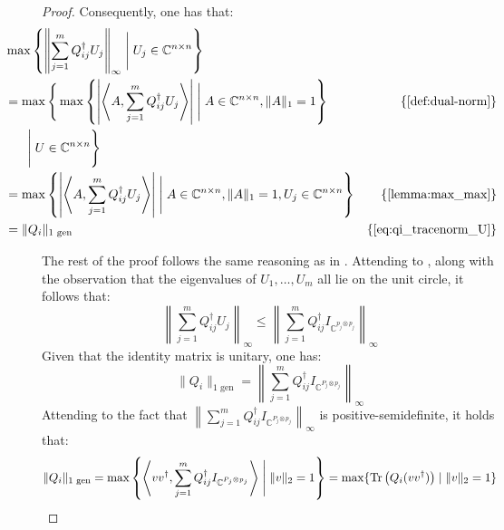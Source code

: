\begin{proof}
Consequently, one has that:
\begin{align}
&\hspace{-30pt} \max \left\{ \left\lVert \sum_{j=1}^{m} Q_{ij}^{\dag} U_j  \right\rVert_{\infty} \Biggm| U_j \in \mathbb{C}^{n \times n} \right\} \notag \\
& \hspace{-30pt} = \max \Bigg\{ \max \left\{ \left| \left\langle A, \sum_{j=1}^{m} Q_{ij}^{\dag}U_j \right\rangle \right| \Biggm| A  \in \mathbb{C}^{n \times n},  \lVert A \rVert_{1} =1  \right\}  & \{\text{\autoref{def:dual-norm}} \}  \notag\\
& \hspace{-15pt}\Biggm|  U \in \mathbb{C}^{n \times n}\Bigg\} \notag\\
&  \hspace{-30pt} =  \max \left\{  \left| \left\langle A, \sum_{j=1}^{m} Q_{ij}^{\dag}U_j \right\rangle \right|  \Biggm|A  \in \mathbb{C}^{n \times n}, \lVert A \rVert_{1} =1,  U_j \in \mathbb{C}^{n \times n} \right\} & \{\text{\autoref{lemma:max_max}}\} \notag \\
& \hspace{-30pt} = \lVert Q_i \rVert_{1 \text{ gen}} & \{\text{\autoref{eq:qi_tracenorm_U}} \} 
\end{align}


The rest of the proof follows the same reasoning as in \cite[Proof of Theorem 3.39 ]{watrous2018theory}. Attending to \cite[ Equation 3.236, Equation 3.237 and Lemma 3.3]{watrous2018theory}, along with the observation
that the eigenvalues of $U_1, \ldots, U_m$ all lie on the unit circle, it follows that:
\begin{equation}
  \left\lVert \sum_{j=1}^{m} Q_{ij}^{\dag} U_j  \right\rVert_{\infty} \leq \left\lVert \sum_{j=1}^{m} Q_{ij}^{\dag} I_{\mathbb{C}^{p_j \otimes p_j}}  \right\rVert_{\infty} 
\end{equation}
Given that the identity matrix is unitary, one has:
\begin{equation}
  \lVert Q_i \rVert_{1 \text{ gen}} = \left\lVert \sum_{j=1}^{m} Q_{ij}^{\dag} I_{\mathbb{C}^{P_j \otimes p_j}}  \right\rVert_{\infty}
\end{equation}
Attending to the fact that $\left\lVert \sum_{j=1}^{m} Q_{ij}^{\dag} I_{\mathbb{C}^{P_j \otimes p_j}}  \right\rVert_{\infty}$ is positive-semidefinite, it holds that:
\begin{equation}
  \lVert Q_i \rVert_{1 \text{ gen}} =\max \left\{ \left\langle vv^{\dag}, \sum_{j=1}^{m} Q_{ij}^{\dag} I_{\mathbb{C}^{P_j \otimes p_j}} \right\rangle \Biggm| \lVert v \rVert_2 = 1 \right\} = \max \{ \text{Tr}\left(Q_i(vv^{\dag}) \right) \mid \lVert v \rVert_{2}=1 \}
\end{equation}

\end{proof}
 
